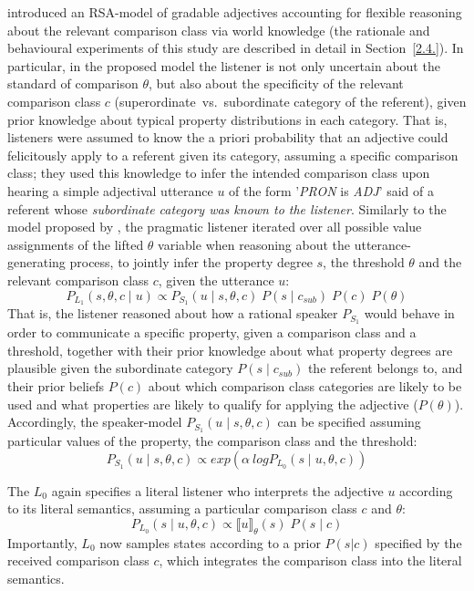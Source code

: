 \textcite{tessler2017warm} introduced an RSA-model of gradable adjectives accounting for flexible reasoning about the relevant comparison class via world knowledge (the rationale and behavioural experiments of this study are described in detail in Section~\ref{2.4.}). In particular, in the proposed model the listener is not only uncertain about the standard of comparison $\theta$, but also about the specificity of the relevant comparison class $c$ (superordinate~vs.~subordinate category of the referent), given prior knowledge about typical property distributions in each category. That is, listeners were assumed to know the a priori probability that an adjective could felicitously apply to a referent given its category, assuming a specific comparison class; they used this knowledge to infer the intended comparison class upon hearing a simple adjectival utterance $u$ of the form '\emph{PRON} is \emph{ADJ}' said of a referent whose \emph{subordinate category was known to the listener}.
Similarly to the model proposed by \textcite{lassiter2013context}, the pragmatic listener iterated over all possible value assignments of the lifted $\theta$ variable when reasoning about the utterance-generating process, to jointly infer the property degree $s$, the threshold $\theta$ and the relevant comparison class $c$, given the utterance $u$:
\begin{equation}
P_{L_1}(s, \theta, c \mid u) \propto P_{S_1} ( u \mid s, \theta, c) \; P(s \mid c_{sub}) \; P(c) \; P(\theta)
\end{equation} 
That is, the listener reasoned about how a rational speaker $P_{S_1}$ would behave in order to communicate a specific property, given a comparison class and a threshold, together with their prior knowledge about what property degrees are plausible given the subordinate category $P(s \mid c _{sub})$ the referent belongs to, and their prior beliefs $P(c)$ about which comparison class categories are likely to be used and what properties are likely to qualify for applying the adjective ($P(\theta)$). Accordingly, the speaker-model $P_{S_1}( u \mid s, \theta, c)$ can be specified assuming particular values of the property, the comparison class and the threshold:
\begin{equation}
P_{S_1}( u \mid s, \theta, c) \propto exp(\alpha \: log P_{L_0} (s \mid u, \theta, c))
\end{equation}

The $L_0$ again specifies a literal listener who interprets the adjective $u$ according to its literal semantics, assuming a particular comparison class $c$ and $\theta$:
\begin{equation}
P_{L_0}(s \mid u, \theta, c) \propto \llbracket u \rrbracket_{\theta} (s) \; P( s \mid c)
\end{equation}  
Importantly, $L_0$ now samples states according to a prior $P(s|c)$ specified by the received comparison class $c$, which integrates the comparison class into the literal semantics. 

